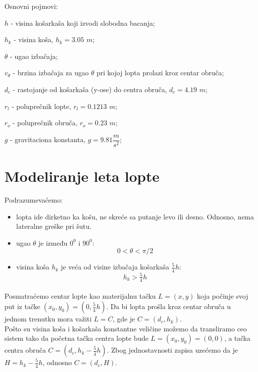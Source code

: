 \documentclass[a4paper, 12pt]{article}
\begin{document}
Osnovni pojmovi:

\begin{list}{}{}

\item $h$ - visina košarkaša koji izvodi slobodna bacanja;
\item $h_k$ - visina koša, $h_k = 3.05$ $m$;
\item $\theta$ - ugao izbačaja;
\item $v_\theta$ - brzina izbačaja za ugao $\theta$ pri kojoj lopta prolazi kroz centar obruča;
\item $d_c$ - rastojanje od košarkaša (y-ose) do centra obruča, $d_c = 4.19$ $m$;
\item $r_l$ - poluprečnik lopte, $r_l = 0.1213$ $m$;
\item $r_o$ - poluprečnik obruča, $r_o = 0.23$ $m$;
\item $g$ - gravitaciona konstanta, $g = 9.81 \dfrac{m}{s^2}$;

\end{list}


\section{Modeliranje leta lopte}

Podrazumevaćemo:
\begin{itemize}

\item lopta ide dirketno ka košu, ne skreće sa putanje levo ili desno. Odnosno, nema lateralne greške pri šutu.

\item ugao $\theta$ je između $0^0$ i $90^0$:\\
\[0 < \theta < \pi/2\]

\item visina koša $h_k$ je veća od visine izbačaja košarkaša $\dfrac{_5}{^4}h$:\\
\[h_k > \dfrac{_5}{^4}h\]

\end{itemize}


Posmatraćemo centar lopte kao materijalnu tačku $L = (x,y)$ koja počinje svoj put iz tačke $(x_0,y_0) = (0,\dfrac{_5}{^4}h)$. Da bi lopta prošla kroz centar obruča u jednom trenutku mora važiti $L = C$, gde je $C = (d_c,h_k)$.\\

Pošto su visina koša i košarkaša konstantne veličine možemo da transliramo ceo sistem tako da početna tačka centra lopte bude $L = (x_0,y_0) = (0,0)$, a tačka centra obruča $C = (d_c,h_k-\dfrac{_5}{^4}h)$.
Zbog jednostavnosti zapisa uzećemo da je $H = h_k-\dfrac{_5}{^4}h$, odnosno $C = (d_c,H)$.\\
\end{document}
